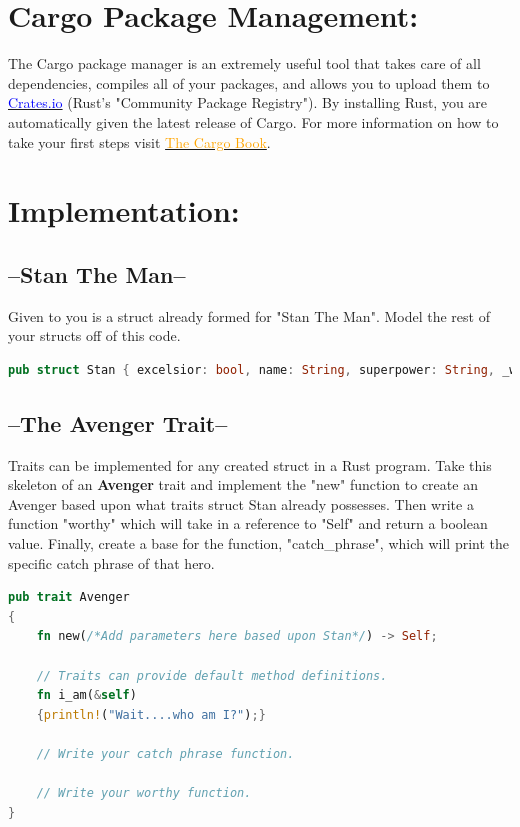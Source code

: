 \documentclass[11pt]{article}
\begin{document}
\section*{Cargo Package Management:}
The Cargo package manager is an extremely useful tool that takes care of all dependencies, compiles all of your packages, and allows you to upload them to \href{https://crates.io/}{\textcolor{blue}{Crates.io}} (Rust's "Community Package Registry"). By installing Rust, you are automatically given the latest release of Cargo. For more information on how to take your first steps visit \href{https://doc.rust-lang.org/cargo/index.html}{\textcolor{orange}{The Cargo Book}}.
\newpage
\section*{Implementation:}

\subsection*{--Stan The Man--}
Given to you is a struct already formed for "Stan The Man". Model the rest of your structs off of this code. 

\begin{lstlisting}[language=rust]
pub struct Stan { excelsior: bool, name: String, superpower: String, _weapon: String }
\end{lstlisting}

\subsection*{--The Avenger Trait--}
Traits can be implemented for any created struct in a Rust program. Take this skeleton of an \textbf{Avenger} trait and implement the "new" function to create an Avenger based upon what traits struct Stan already possesses. Then write a function "worthy" which will take in a reference to "Self" and return a boolean value. Finally, create a base for the function, "catch\_phrase", which will print the specific catch phrase of that hero.  
\begin{lstlisting}[language=rust]
pub trait Avenger
{
    fn new(/*Add parameters here based upon Stan*/) -> Self;

    // Traits can provide default method definitions.
    fn i_am(&self)
    {println!("Wait....who am I?");}

    // Write your catch phrase function.
    
    // Write your worthy function.
}
\end{lstlisting}
\end{document}

